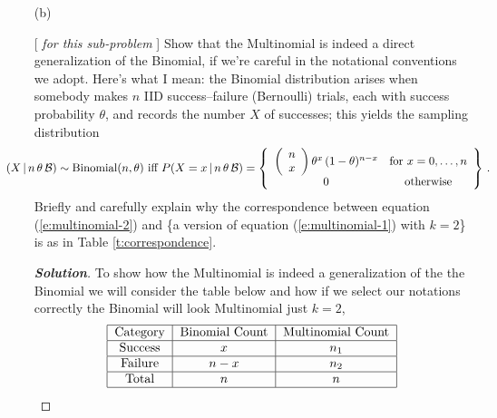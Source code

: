 \documentclass[12pt]{article}
\newcommand{\given}{\, | \,}
\newenvironment{solution}{\begin{tcolorbox}[breakable]\begin{proof}[\textbf{\textit{Solution}}] }{\end{proof}\end{tcolorbox}}
\begin{document}
\begin{itemize}
\newpage
\item[(b)]

[ \textit{ \vspace*{0.025in} for this sub-problem} ] Show that the Multinomial is indeed a direct generalization of the Binomial, if we're careful in the notational conventions we adopt. Here's what I mean: the Binomial distribution arises when somebody makes $n$ IID success--failure (Bernoulli) trials, each with success probability $\theta$, and records the number $X$ of successes; this yields the sampling distribution
\begin{equation} \label{e:multinomial-2}
\hspace*{-0.35in} ( X \given n \, \theta \, \mathcal{ B } ) \sim \textrm{Binomial} ( n, \theta ) \textrm{ iff } P ( X = x \given n \, \theta \, \mathcal{ B } ) = \left\{ \begin{array}{cc} \left( \begin{array}{c} n \\ x \end{array} \right) \theta^x \, ( 1 - \theta )^{ n - x } & \textrm{for } x = 0, \dots, n \\ 0 & \textrm{otherwise} \end{array} \right\} \, .
\end{equation}
Briefly and carefully explain why the correspondence between equation (\ref{e:multinomial-2}) and \{a version of equation (\ref{e:multinomial-1}) with $k = 2$\} is as in Table \ref{t:correspondence}. \textit{}

\begin{solution}
    To show how the Multinomial is indeed a generalization of the the Binomial we will consider the table below and how if we select our notations correctly the Binomial will look Multinomial just $k= 2$,
    \[\begin{tabular}{| c | c | c|} 
        \hline
        Category & Binomial Count & Multinomial Count \\
        \hline
        Success & $x$ & $n_1$ \\
        \hline
        Failure & $n-x$ & $n_2$ \\
        \hline
        Total & $n$ & $n$  \\
        \hline
    \end{tabular}\]


\end{solution}
\end{itemize}
\end{document}
